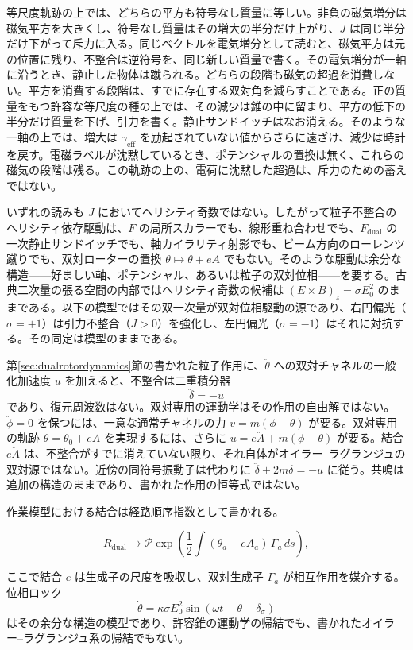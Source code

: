 \documentclass[a4paper]{article}
\begin{document}
等尺度軌跡の上では、どちらの平方も符号なし質量に等しい。非負の磁気増分は磁気平方を大きくし、符号なし質量はその増大の半分だけ上がり、\(J\) は同じ半分だけ下がって斥力に入る。同じベクトルを電気増分として読むと、磁気平方は元の位置に残り、不整合は逆符号を、同じ新しい質量で書く。その電気増分が一軸に沿うとき、静止した物体は蹴られる。どちらの段階も磁気の超過を消費しない。平方を消費する段階は、すでに存在する双対角を減らすことである。正の質量をもつ許容な等尺度の種の上では、その減少は錐の中に留まり、平方の低下の半分だけ質量を下げ、引力を書く。静止サンドイッチはなお消える。そのような一軸の上では、増大は \(\gamma_{\mathrm{eff}}\) を励起されていない値からさらに遠ざけ、減少は時計を戻す。電磁ラベルが沈黙しているとき、ポテンシャルの置換は無く、これらの磁気の段階は残る。この軌跡の上の、電荷に沈黙した超過は、斥力のための蓄えではない。

いずれの読みも $J$ においてヘリシティ奇数ではない。したがって粒子不整合のヘリシティ依存駆動は、$F$ の局所スカラーでも、線形重ね合わせでも、$F_{\mathrm{dual}}$ の一次静止サンドイッチでも、軸カイラリティ射影でも、ビーム方向のローレンツ蹴りでも、双対ローターの置換 $\theta\mapsto\theta+eA$ でもない。そのような駆動は余分な構造——好ましい軸、ポテンシャル、あるいは粒子の双対位相——を要する。古典二次量の張る空間の内部ではヘリシティ奇数の候補は $(E\times B)_z=\sigma E_0^2$ のままである。以下の模型ではその双一次量が双対位相駆動の源であり、右円偏光（$\sigma=+1$）は引力不整合（$J>0$）を強化し、左円偏光（$\sigma=-1$）はそれに対抗する。その同定は模型のままである。

第\ref{sec:dualrotordynamics}節の書かれた粒子作用に、$\ddot\theta$ への双対チャネルの一般化加速度 $u$ を加えると、不整合は二重積分器
\[
\ddot\delta=-u
\]
であり、復元周波数はない。双対専用の運動学はその作用の自由解ではない。$\ddot\phi=0$ を保つには、一意な通常チャネルの力 $v=m(\phi-\theta)$ が要る。双対専用の軌跡 $\theta=\theta_0+eA$ を実現するには、さらに $u=e\ddot A+m(\phi-\theta)$ が要る。結合 $e\ddot A$ は、不整合がすでに消えていない限り、それ自体がオイラー--ラグランジュの双対源ではない。近傍の同符号振動子は代わりに $\ddot\delta+2m\delta=-u$ に従う。共鳴は追加の構造のままであり、書かれた作用の恒等式ではない。

作業模型における結合は経路順序指数として書かれる。

\[
R_{\text{dual}} \to \mathcal{P} \exp\!\left( \frac{1}{2} \int (\theta_a + e A_a)\, \Gamma_a \, ds \right),
\]

ここで結合 $e$ は生成子の尺度を吸収し、双対生成子 $\Gamma_a$ が相互作用を媒介する。位相ロック
\[
\dot{\theta} = \kappa \sigma E_0^2 \sin(\omega t - \theta + \delta_\sigma)
\]
はその余分な構造の模型であり、許容錐の運動学の帰結でも、書かれたオイラー--ラグランジュ系の帰結でもない。
\end{document}
